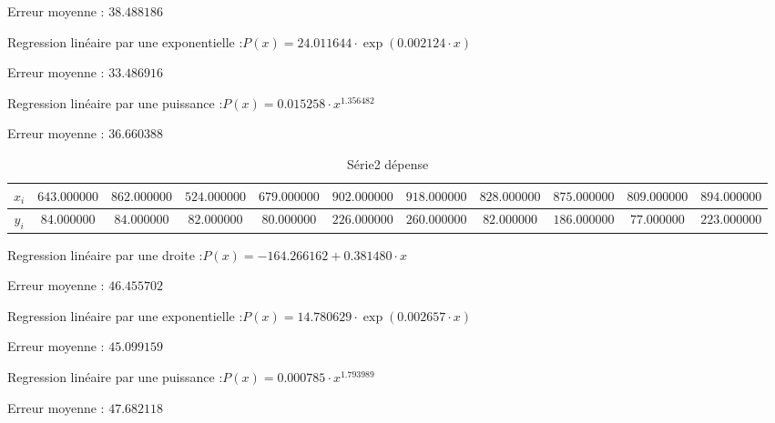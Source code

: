 \documentclass{report}
\begin{document}
	Erreur moyenne : $38.488186$
	
	Regression linéaire par une exponentielle :$P(x) = 24.011644 \cdot \exp(0.002124 \cdot x)$
	
	Erreur moyenne : $33.486916$
	
	Regression linéaire par une puissance :$P(x) = 0.015258 \cdot x^{1.356482}$
	
	Erreur moyenne : $36.660388$
      
      \newpage
   \begin{table}[h]
	\centering
	\begin{tabular}{| c | c | c | c | c | c | c | c | c | c | c |}
	\hline 
	$x_{i}$ & $643.000000$ & $862.000000$ & $524.000000$ & $679.000000$ & $902.000000$ & $918.000000$ & $828.000000$ & $875.000000$ & $809.000000$ & $894.000000$ \\ 
	\hline 
	$y_{i}$ & $84.000000$ & $84.000000$ & $82.000000$ & $80.000000$ & $226.000000$ & $260.000000$ & $82.000000$ & $186.000000$ & $77.000000$ & $223.000000$ \\ 
	\hline 
	\end{tabular}
	\caption{Série2 dépense}
	\label{Jeux d'essais approximation 3.3 Série 2}
      \end{table}
	Regression linéaire par une droite :$P(x) =  - 164.266162 + 0.381480 \cdot x$
	
	Erreur moyenne : $46.455702$
	
	Regression linéaire par une exponentielle :$P(x) = 14.780629 \cdot \exp(0.002657 \cdot x)$
	
	Erreur moyenne : $45.099159$
	
	Regression linéaire par une puissance :$P(x) = 0.000785  \cdot x^{1.793989}$
	
	Erreur moyenne : $47.682118$
      
\end{document}
